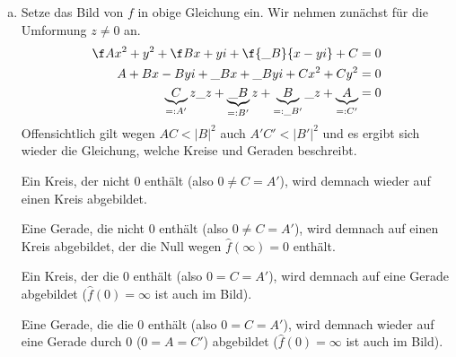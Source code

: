 \documentclass[a4paper]{scrartcl}
\begin{document}
\begin{aufgabe}
\begin{enumerate}[a)]
\begin{seg}{Lösungen der Gleichung sind Geraden und Kreise}
					Sei jetzt eine Gerade gegeben (also $A=0$).
					Dann ergibt sich nach kurzer Umformung
					\[
						(\Re B) x - (\Im B)y + C = 0
					\]
					Für $\Im B\neq 0$ ergibt sich eine Geradengleichung der Form
					\[
						y = \f {\Re B}{\Im B}x + \f C{\Im B}
					\]
					Aus $\Im B = 0$ folgt unmittelbar wegen $0=AC<|B|^2$, dass $\Re B\neq 0$ und es ergibt sich eine Gerade der Form
					\[
						x= -\f C{\Re B}
					\]
				\end{seg}
			\item
				Setze das Bild von $f$ in obige Gleichung ein.
				Wir nehmen zunächst für die Umformung $z\neq 0$ an.
				\begin{align*}
					\f A{x^2+y^2} + \f B{x+yi} + \f {\_B}{x-yi} + C &= 0\\
						   A + Bx -Byi + \_B x + \_Byi + Cx^2 +Cy^2 &= 0\\
		   \underbrace{C}_{=:A'}z\_z + \underbrace{\_B}_{=:B'}z + \underbrace{B}_{=:\_{B'}}\_z + \underbrace{A}_{=:C'} &= 0
				\end{align*}
				Offensichtlich gilt wegen $AC<|B|^2$ auch $A'C'<|B'|^2$ und es ergibt sich wieder die Gleichung, welche Kreise und Geraden beschreibt.

				Ein Kreis, der nicht $0$ enthält (also $0\neq C=A'$), wird demnach wieder auf einen Kreis abgebildet.

				Eine Gerade, die nicht $0$ enthält (also $0\neq C=A'$), wird demnach auf einen Kreis abgebildet, der die Null wegen $\hat f(\infty)=0$ enthält.

				Ein Kreis, der die $0$ enthält (also $0=C=A'$), wird demnach auf eine Gerade abgebildet ($\hat f(0)=\infty$ ist auch im Bild).

				Eine Gerade, die die $0$ enthält (also $0=C=A'$), wird demnach wieder auf eine Gerade durch $0$ ($0=A=C'$) abgebildet ($\hat f(0)=\infty$ ist auch im Bild).
		\end{enumerate}
	\end{aufgabe}
\end{document}
